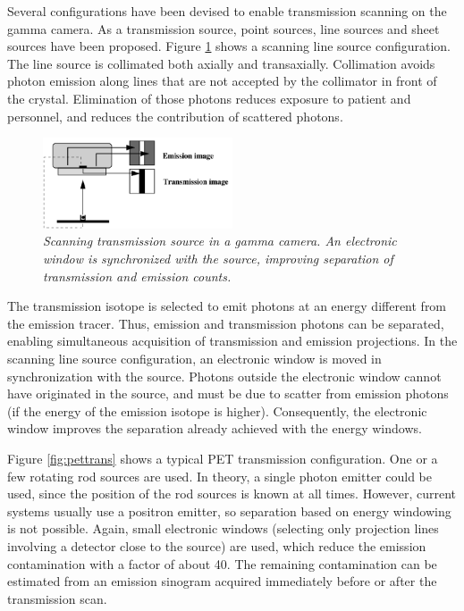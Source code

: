 \documentclass[11pt,oneside]{book}
\begin{document}
Several configurations have been devised to enable transmission
scanning on the gamma camera. As a transmission source, point sources,
line sources and sheet sources have been proposed. Figure
\ref{fig:specttrans} shows a scanning line source configuration. The
line source is collimated both axially and transaxially. Collimation
avoids photon emission along lines that are not accepted by the
collimator in front of the crystal. Elimination of those photons
reduces exposure to patient and personnel, and reduces the
contribution of scattered photons.

\begin{figure}[tb]
\centering
\includegraphics[width=0.5\textwidth]{figs/fig_specttrans.pdf}
\caption{\label{fig:specttrans} \emph{Scanning transmission source in a gamma
camera. An electronic window is synchronized with the source, improving
separation of transmission and emission counts.}}
\end{figure}

The transmission isotope is selected to emit photons at an energy
different from the emission tracer. Thus, emission and transmission
photons can be separated, enabling simultaneous acquisition of
transmission and emission projections. In the scanning line source
configuration, an electronic window is moved in synchronization
with the source. Photons outside the electronic window cannot have
originated in the source, and must be due to scatter from emission
photons (if the energy of the emission isotope is
higher). Consequently, the electronic window improves the separation
already achieved with the energy windows.

Figure \ref{fig:pettrans} shows a typical PET transmission
configuration. One or a few rotating rod sources are used. In theory,
a single photon emitter could be used, since the position of the rod
sources is known at all times. However, current systems usually use a
positron emitter, so separation based on energy windowing is not
possible. Again, small electronic windows (selecting only projection
lines involving a detector close to the source) are used, which reduce
the emission contamination with a factor of about 40. The remaining
contamination can be estimated from an emission sinogram acquired
immediately before or after the transmission scan.
\end{document}
